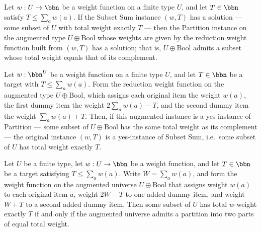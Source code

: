 \begin{theorem}
\label{SubsetSumToPartition.SubsetSumToPartitionCompleteness}
\leanok
{}
Let $w : U \to \bbn$ be a weight function on a finite type $U$, and let $T \in \bbn$
satisfy $T \le \sum_{a} w(a)$. If the Subset Sum instance $(w, T)$ has a solution — some
subset of $U$ with total weight exactly $T$ — then the Partition instance on the
augmented type $U \oplus \mathrm{Bool}$ whose weights are given by the reduction weight
function built from $(w, T)$ has a solution; that is, $U \oplus \mathrm{Bool}$ admits a
subset whose total weight equals that of its complement.
\end{theorem}

\begin{theorem}
\label{SubsetSumToPartition.SubsetSumToPartitionSoundness}
\leanok
{}
Let $w : \bbn^{U}$ be a weight function on a finite type $U$, and let $T \in \bbn$ be a
target with $T \le \sum_{a} w(a)$. Form the reduction weight function on the augmented
type $U \oplus \mathrm{Bool}$, which assigns each original item the weight $w(a)$, the
first dummy item the weight $2\sum_a w(a) - T$, and the second dummy item the weight
$\sum_a w(a) + T$. Then, if this augmented instance is a yes-instance of Partition —
some subset of $U \oplus \mathrm{Bool}$ has the same total weight as its complement —
the original instance $(w, T)$ is a yes-instance of Subset Sum, i.e.\ some subset of $U$
has total weight exactly $T$.
\end{theorem}

\begin{theorem}
\label{SubsetSumToPartition.SubsetSumToPartitionReduction}
\leanok
{}
Let $U$ be a finite type, let $w : U \to \bbn$ be a weight function, and let $T \in
\bbn$ be a target satisfying $T \le \sum_{a} w(a)$. Write $W = \sum_{a} w(a)$, and form
the weight function on the augmented universe $U \oplus \mathrm{Bool}$ that assigns
weight $w(a)$ to each original item $a$, weight $2W - T$ to one added dummy item, and
weight $W + T$ to a second added dummy item. Then some subset of $U$ has total
$w$-weight exactly $T$ if and only if the augmented universe admits a partition into two
parts of equal total weight.
\end{theorem}
